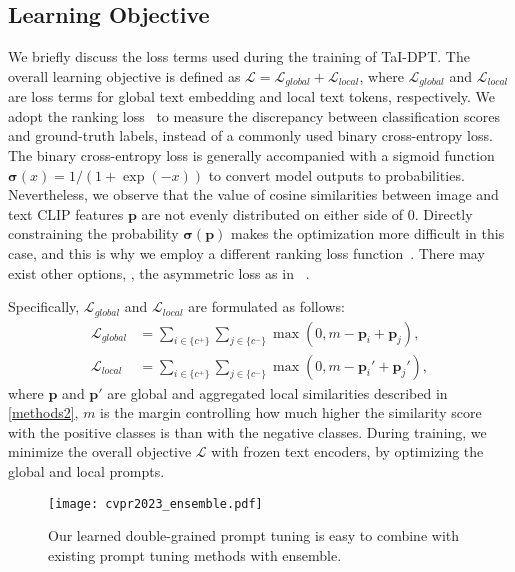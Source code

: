 \documentclass[10pt,twocolumn,letterpaper]{article}
\begin{document}
\subsection{Learning Objective}
\label{methods3}
We briefly discuss the loss terms used during the training of TaI-DPT.
The overall learning objective is defined as $\mathcal{L} =\mathcal{L}_{global}+\mathcal{L}_{local}$,
where $\mathcal{L}_{global}$ and $\mathcal{L}_{local}$ are loss terms for global text embedding and local text tokens, respectively.
We adopt the ranking loss~\cite{rankingloss} to measure the discrepancy between classification scores and ground-truth labels, instead of a commonly used binary cross-entropy loss.
The binary cross-entropy loss is generally accompanied with a sigmoid function $\boldsymbol \sigma(x) = 1/(1 + \exp(-x)) $ to convert model outputs to probabilities. 
Nevertheless, we observe that the value of cosine similarities between image and text CLIP features $\boldsymbol p$ are not evenly distributed on either side of 0. 
Directly constraining the probability $\boldsymbol \sigma(\boldsymbol p)$ makes the optimization more difficult in this case, and this is why we employ a different ranking loss function~\cite{rankingloss}.
There may exist other options, \eg, the asymmetric loss as in ~\cite{dualcoop}.


Specifically, $\mathcal{L}_{global}$ and $\mathcal{L}_{local}$ are formulated as follows:
\begin{equation}
\begin{split}
\mathcal{L}_{global} &\!=\! { \sum\nolimits_{i \in \{{c^+}\}}} { \sum\nolimits_{j\in \{{c^-}\}}} \max(0, m \!-\!\boldsymbol p_i \!+\! \boldsymbol p_j),\\
  \mathcal{L}_{local} &\!=\! { \sum\nolimits_{i \in \{{c^+}\}}} { \sum\nolimits_{j \in \{{c^-}\}}} \max(0, m \!-\! \boldsymbol p_i'\!+\! \boldsymbol p_j'),
  \label{eq:rl}
\end{split}
\end{equation}
\noindent where $\boldsymbol p$ and $\boldsymbol p'$ are global and aggregated local similarities described in \cref{methods2}, $m$ is the margin controlling how much higher the similarity score with the positive classes is than with the negative classes. 
During training, we minimize the overall objective $\mathcal{L}$ with frozen text encoders, by optimizing the global and local prompts.


\begin{figure}
  \centering
\texttt{[image: cvpr2023\_ensemble.pdf]}

  \caption{Our learned double-grained prompt tuning is easy to combine with existing prompt tuning methods with ensemble.}
  \label{fig:ensemble}
\end{figure}
\end{document}
